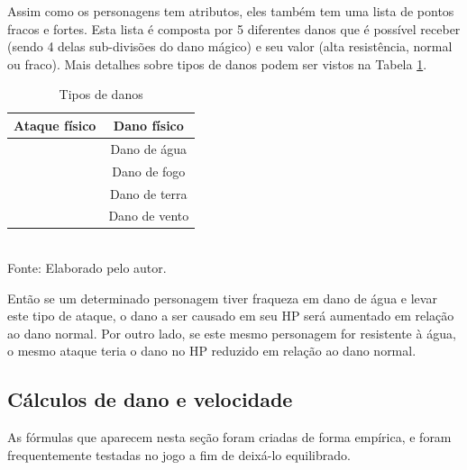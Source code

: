 \documentclass[
	12pt,					%
	openright,				%
	oneside,				%
	a4paper,				%
	bibjustif,				%
	chapter=TITLE,			%
	english,				%
	brazil,					%
	]{abntex2}
\newcommand{\source}[1]{\small Fonte: {#1}}
\begin{document}
	Assim como os personagens tem atributos,
	eles também tem uma lista de pontos fracos e fortes.
	Esta lista é composta por 5 diferentes danos que é possível receber
	(sendo 4 delas sub-divisões do dano mágico)
	e seu valor (alta resistência, normal ou fraco).
	Mais detalhes sobre tipos de danos podem ser vistos na Tabela \ref{tab:damageTypes}.
	
	\begin{table}[h]
		\caption{Tipos de danos}
		\centering
		\small
		\renewcommand{\arraystretch}{1.2} %
		\begin{tabular}{>{\centering\arraybackslash}c|c}
			\hline 
			Ataque físico & Dano físico \\ 
			\hline 
			\multirow{4}{*}{Ataque mágico (elemental)}	& Dano de água \\\cline{2-2}
														& Dano de fogo \\\cline{2-2}
														& Dano de terra \\\cline{2-2}
														& Dano de vento \\
			\hline 
		\end{tabular}\\
		\vspace{3mm}
		\source{Elaborado pelo autor.}
		\label{tab:damageTypes}
	\end{table}
	
	Então se um determinado personagem tiver fraqueza em dano de água e levar este tipo de ataque,
	o dano a ser causado em seu HP será aumentado em relação ao dano normal.
	Por outro lado, se este mesmo personagem for resistente à água,
	o mesmo ataque teria o dano no HP reduzido em relação ao dano normal.
	
	\subsection{Cálculos de dano e velocidade}
	
	As fórmulas que aparecem nesta seção foram criadas de forma empírica,
	e foram frequentemente testadas no jogo a fim de deixá-lo equilibrado.
	
\end{document}
